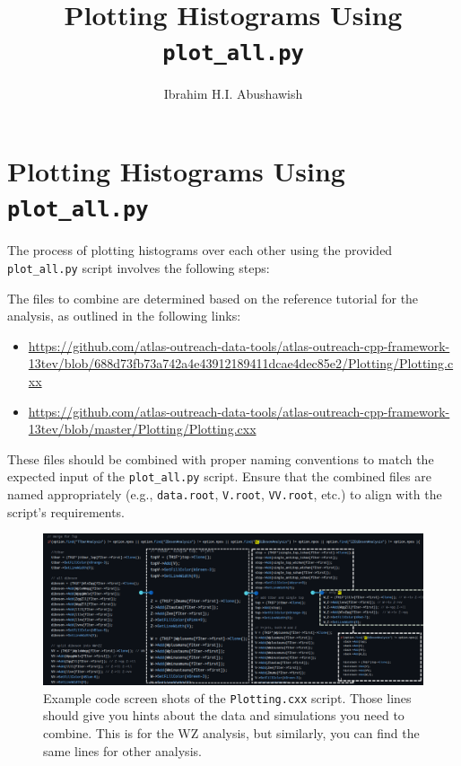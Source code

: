 \documentclass{article}
\begin{document}
\title{Plotting Histograms Using \texttt{plot\_all.py}}
\author{Ibrahim H.I. Abushawish}
\maketitle
\section*{Plotting Histograms Using \texttt{plot\_all.py}}
The process of plotting histograms over each other using the provided \texttt{plot\_all.py} script involves the following steps:

The files to combine are determined based on the reference tutorial for the analysis, as outlined in the following links:
\begin{itemize}
    \item {\scriptsize \url{https://github.com/atlas-outreach-data-tools/atlas-outreach-cpp-framework-13tev/blob/688d73fb73a742a4e43912189411dcae4dec85e2/Plotting/Plotting.cxx}}
    \item {\scriptsize \url{https://github.com/atlas-outreach-data-tools/atlas-outreach-cpp-framework-13tev/blob/master/Plotting/Plotting.cxx}}
\end{itemize}

These files should be combined with proper naming conventions to match the expected input of the \texttt{plot\_all.py} script. Ensure that the combined files are named appropriately (e.g., \texttt{data.root}, \texttt{V.root}, \texttt{VV.root}, etc.) to align with the script's requirements.


\begin{figure}[h]
    \centering
    \includegraphics[width=\textwidth]{IMAGES/united.png}
    \caption{Example code screen shots of the \texttt{Plotting.cxx} script. Those lines should give you hints about the data and simulations you need to combine. This is for the WZ analysis, but similarly, you can find the same lines for other analysis.}
    \label{fig:united}
\end{figure}
\end{document}
